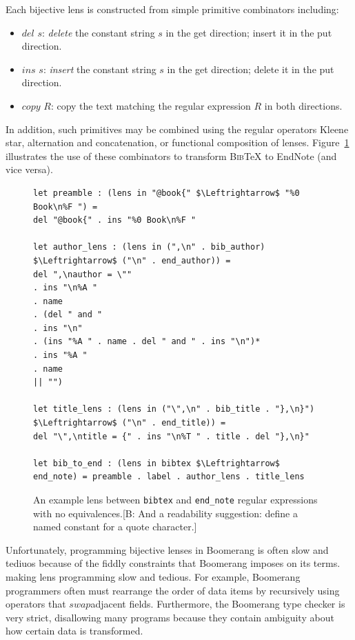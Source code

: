\documentclass[acmsmall,review,anonymous]{acmart}
\newcommand{\FINISH}[3]{\ifdraft\textcolor{#1}{[#2: #3]}\fi}
\newcommand{\bcp}[1]{\FINISH{dkred}{B}{#1}}
\newcommand{\kw}[1]{\ensuremath{\mathit{#1}}}
\newcommand{\bibtex}{\textsc{Bib}\TeX{}}
\newcommand{\swap}{\ensuremath{\kw{swap}}}
\newcommand{\cd}[1]{\lstinline[backgroundcolor=\color{white}]$#1$}
\begin{document}
Each bijective lens is constructed from simple primitive combinators including:
\begin{itemize}
  \item \kw{del} $s$: \textit{delete} the constant string $s$ in the get
  direction; insert it in the put direction.
  \item \kw{ins} $s$: \textit{insert} the constant string $s$ in the get
  direction; delete it in the put direction.
  \item \kw{copy} $R$: copy the text matching the regular expression $R$ in
  both directions.
\end{itemize}
In addition, such primitives may be combined using the regular operators
Kleene star, alternation and concatenation, or functional composition of
lenses.  Figure~\ref{fig:example-lens} illustrates the use of these
combinators to transform \bibtex{} to EndNote (and vice versa).
\begin{figure}[t]
\begin{lstlisting}
let preamble : (lens in "@book{" $\Leftrightarrow$ "%0 Book\n%F ") =
del "@book{" . ins "%0 Book\n%F "

let author_lens : (lens in (",\n" . bib_author) $\Leftrightarrow$ ("\n" . end_author)) =
del ",\nauthor = \""
. ins "\n%A "
. name
. (del " and "
. ins "\n"
. (ins "%A " . name . del " and " . ins "\n")*
. ins "%A "
. name
|| "")

let title_lens : (lens in ("\",\n" . bib_title . "},\n}") $\Leftrightarrow$ ("\n" . end_title)) =
del "\",\ntitle = {" . ins "\n%T " . title . del "},\n}"

let bib_to_end : (lens in bibtex $\Leftrightarrow$ end_note) = preamble . label . author_lens . title_lens
\end{lstlisting}
\caption{An example lens between \cd{bibtex} and \cd{end_note} regular
expressions with no equivalences.\bcp{And a readability suggestion:
define a named constant for a quote character.}}
\label{fig:example-lens}
\end{figure}

Unfortunately, programming bijective lenses in Boomerang is often slow and
tediuos because of the fiddly constraints that Boomerang imposes on its
terms. making lens programming slow and tedious. For example, Boomerang
programmers often must rearrange the order of data items by recursively using
operators that \swap adjacent fields. Furthermore, the Boomerang type checker is
very strict, disallowing many programs because they contain ambiguity about how
certain data is transformed. 
\end{document}
